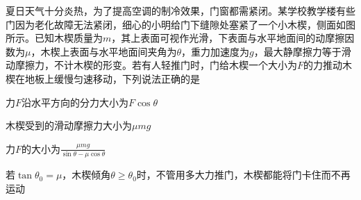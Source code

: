 夏日天气十分炎热，为了提高空调的制冷效果，门窗都需紧闭。某学校教学楼有些门因为老化故障无法紧闭，细心的小明给门下缝隙处塞紧了一个小木楔，侧面如图所示。已知木楔质量为\(m\)，其上表面可视作光滑，下表面与水平地面间的动摩擦因数为\(\mu\)，木楔上表面与水平地面间夹角为\(\theta\)，重力加速度为\(g\)，最大静摩擦力等于滑动摩擦力，不计木楔的形变。若有人轻推门时，门给木楔一个大小为\(F\)的力推动木楔在地板上缓慢匀速移动，下列说法正确的是\paren[]

\begin{choices}
	\item 力\(F\)沿水平方向的分力大小为\(F \cos \theta\)
	\item 木楔受到的滑动摩擦力大小为\(\mu mg\)
	\item 力\(F\)的大小为\(\frac{\mu mg}{\sin \theta - \mu \cos \theta}\)
	\item 若\(\tan \theta_0 = \mu\)，木楔倾角\(\theta \geq \theta_0\)时，不管用多大力推门，木楔都能将门卡住而不再运动
\end{choices}
\begin{answer}
    
\end{answer}
